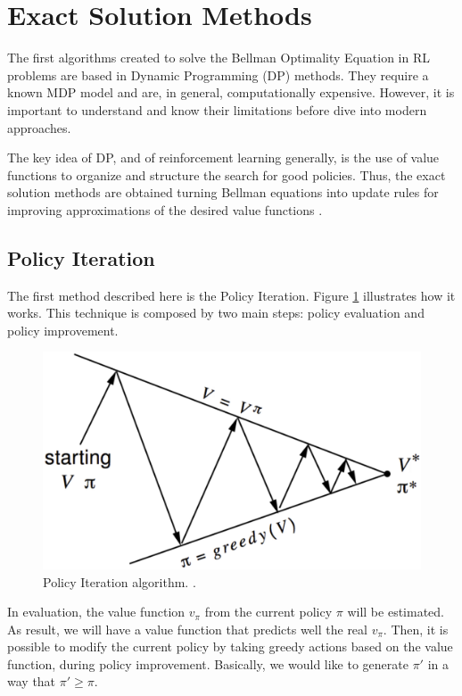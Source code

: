 \section{Exact Solution Methods}\label{sec:exactsolutionmethods}
The first algorithms created to solve the Bellman Optimality Equation in RL problems are based in Dynamic Programming (DP) methods. They require a known MDP model and are, in general, computationally expensive. However, it is important to understand and know their limitations before dive into modern approaches.

The key idea of DP, and of reinforcement learning generally, is the use of value functions to organize
and structure the search for good policies. Thus, the exact solution methods are obtained turning Bellman equations into update rules for improving approximations of the
desired value functions \cite{sutton1998rli}.

\subsection{Policy Iteration}

The first method described here is the Policy Iteration. Figure \ref{fig:policyiteration} illustrates how it works. This technique is composed by two main steps: policy evaluation and policy improvement.


\begin{figure}[!htpb]
	\centering
	\includegraphics[scale=0.5]{Cap4/policyiteration.eps}
	\caption{Policy Iteration algorithm. \cite{davidsilverlec3}.}
	\label{fig:policyiteration}
\end{figure}

In evaluation, the value function $v_{\pi}$ from the current policy $\pi$ will be estimated. As result, we will have a value function that predicts well the real $v_{\pi}$. Then, it is possible to modify the current policy by taking greedy actions based on the value function, during policy improvement. Basically, we would like to generate $\pi'$ in a way that $\pi' \geq \pi$.

